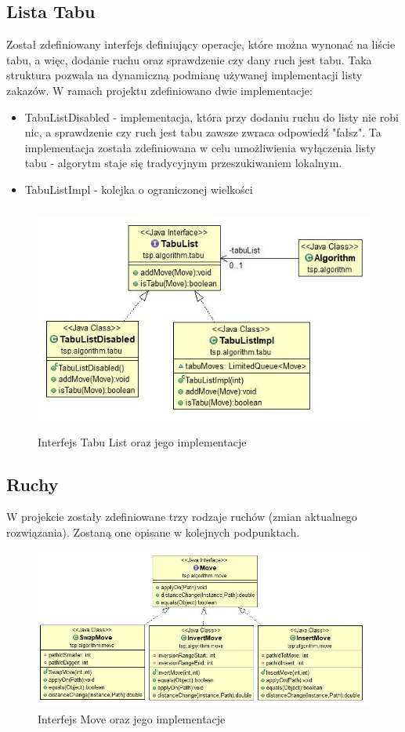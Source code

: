 \documentclass[a4paper,11pt]{article}
\begin{document}
\subsection{Lista Tabu}

Został zdefiniowany interfejs definiujący operacje, które można wynonać na liście tabu, a więc, dodanie ruchu oraz sprawdzenie czy dany ruch jest tabu. Taka struktura pozwala na dynamiczną podmianę używanej implementacji listy zakazów. W ramach projektu zdefiniowano dwie implementacje:
\begin{itemize}
\item TabuListDisabled - implementacja, która przy dodaniu ruchu do listy nie robi nic, a sprawdzenie czy ruch jest tabu zawsze zwraca odpowiedź "fałsz". Ta implementacja została zdefiniowana w celu umożliwienia wyłączenia listy tabu - algorytm staje się tradycyjnym przeszukiwaniem lokalnym.
\item TabuListImpl  - kolejka o ograniczonej wielkości
\end{itemize}

\begin{figure}[H]
\centering
\includegraphics[height=7.5cm]{TabuList.JPG}
\caption{Interfejs Tabu List oraz jego implementacje}
\end{figure}


\subsection{Ruchy}

W projekcie zostały zdefiniowane trzy rodzaje ruchów (zmian aktualnego rozwiązania). Zostaną one opisane w kolejnych podpunktach.

\begin{figure}[H]
\centering
\includegraphics[width=17cm]{Move.JPG}
\caption{Interfejs Move oraz jego implementacje}
\end{figure}
\end{document}
